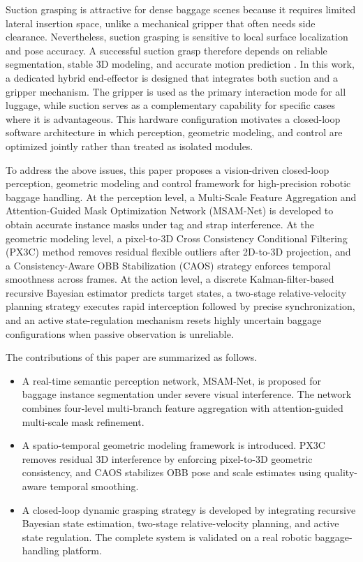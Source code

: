 Suction grasping is attractive for dense baggage scenes because it requires limited lateral insertion space, unlike a mechanical gripper that often needs side clearance. Nevertheless, suction grasping is sensitive to local surface localization and pose accuracy. A successful suction grasp therefore depends on reliable segmentation, stable 3D modeling, and accurate motion prediction \cite{bohg2013data}. In this work, a dedicated hybrid end-effector is designed that integrates both suction and a gripper mechanism. The gripper is used as the primary interaction mode for all luggage, while suction serves as a complementary capability for specific cases where it is advantageous. This hardware configuration motivates a closed-loop software architecture in which perception, geometric modeling, and control are optimized jointly rather than treated as isolated modules.

To address the above issues, this paper proposes a vision-driven closed-loop perception, geometric modeling and control framework for high-precision robotic baggage handling. At the perception level, a Multi-Scale Feature Aggregation and Attention-Guided Mask Optimization Network (MSAM-Net) is developed to obtain accurate instance masks under tag and strap interference. At the geometric modeling level, a pixel-to-3D Cross Consistency Conditional Filtering (PX3C) method removes residual flexible outliers after 2D-to-3D projection, and a Consistency-Aware OBB Stabilization (CAOS) strategy enforces temporal smoothness across frames. At the action level, a discrete Kalman-filter-based recursive Bayesian estimator predicts target states, a two-stage relative-velocity planning strategy executes rapid interception followed by precise synchronization, and an active state-regulation mechanism resets highly uncertain baggage configurations when passive observation is unreliable.

The contributions of this paper are summarized as follows.
\begin{itemize}
  \item A real-time semantic perception network, MSAM-Net, is proposed for baggage instance segmentation under severe visual interference. The network combines four-level multi-branch feature aggregation with attention-guided multi-scale mask refinement.
  \item A spatio-temporal geometric modeling framework is introduced. PX3C removes residual 3D interference by enforcing pixel-to-3D geometric consistency, and CAOS stabilizes OBB pose and scale estimates using quality-aware temporal smoothing.
  \item A closed-loop dynamic grasping strategy is developed by integrating recursive Bayesian state estimation, two-stage relative-velocity planning, and active state regulation. The complete system is validated on a real robotic baggage-handling platform.
\end{itemize}